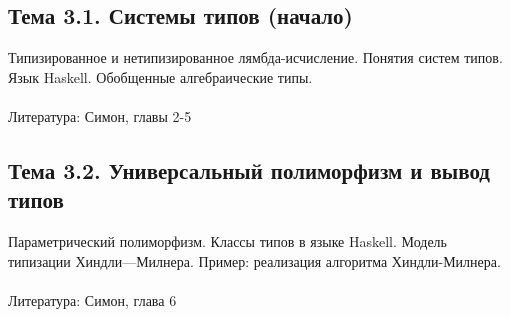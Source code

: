 \documentclass[a4paper,10pt]{article}
\begin{document}
\subsection*{Тема 3.1. Системы типов (начало)}
Типизированное и нетипизированное лямбда-исчисление. Понятия систем типов. Язык Haskell. 
Обобщенные алгебраические типы.
\\\\
Литература: Симон, главы 2-5

\subsection*{Тема 3.2. Универсальный полиморфизм и вывод типов}
Параметрический полиморфизм. Классы типов в языке Haskell. Модель типизации Хиндли—Милнера. Пример: реализация алгоритма Хиндли-Милнера.
\\\\
Литература: Симон, глава 6
\end{document}
